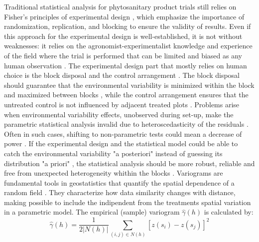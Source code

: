 \documentclass[12pt,a4paper,oneside]{report}
\begin{document}
Traditional statistical analysis for phytosanitary product trials still relies on 
Fisher's principles of experimental design 
\cite{fisherStatisticalMethodsResearch1992,meadStatisticalPrinciplesDesign2012,caslerFundamentalsExperimentalDesign2015},
which emphasize the importance of randomization, replication, and blocking to 
ensure the validity of results. Even if this approach for the experimental design 
is well-established, it is not without weaknesses: it relies on the 
agronomist-experimentalist knowledge and experience of the field where the trial 
is performed that can be limited and biased as any human observation 
\cite{paroliniPursuitScienceAgriculture2015,berryResistedRiseRandomisation2015}. 
The experimental design part 
that mostly relies on human choice is the block disposal and the control 
arrangement \cite{tocherDesignAnalysisBlock1952,williamsOptimalityContrastsBlock2015}. 
The block disposal 
should guarantee that the environmental variability is minimized within the block 
and maximized between blocks \cite{vanesSpatialNatureRandomization1993,brienMultiphaseExperimentsLeast2011}, 
while 
the control arrangement ensures that the untreated control is not influenced by 
adjacent treated plots \cite{piephoWhyRandomizeAgricultural2013}.
Problems arise when environmental variability effects, unobserved during set-up, 
make the parametric statistical analysis invalid due to heteroscedasticity of the 
residuals \cite{schabenbergerStatisticalMethodsSpatial2004,onofriNewMethodAnalysis2010}. 
Often in such cases, 
shifting to non-parametric tests could mean a decrease 
of power \cite{stroupRethinkingAnalysisNonNormal2015,agrestiIntroductionCategoricalData2018}.
If the experimental design and the statistical model could be able to catch 
the environmental variability "a posteriori" instead of guessing its distribution "a priori"
\cite{oliverGeostatisticalApplicationsPrecision2010,websterGeostatisticsEnvironmentalScientists2007}, 
the statistical analysis should be more robust, reliable and free from
unexpected heterogeneity whithin the blocks
\cite{richterGeostatisticalModelsAgricultural2012,lopezEfficiencyIncompleteBlock1995}.
Variograms are fundamental tools in geostatistics that quantify 
the spatial dependence of a random field 
\cite{cressieStatisticsSpatialData2015,goovaertsGeostatisticsNaturalResources1997}. 
They characterize how data similarity 
changes with distance, making possible to include the indipendent from the treatments
spatial variation in a parametric model. 
The empirical (sample) variogram $\hat{\gamma}(h)$ is calculated by:
\[
\hat{\gamma}(h) = \frac{1}{2|N(h)|} \sum_{(i,j) \in N(h)} [z(s_i) - z(s_j)]^2
\]
\end{document}
